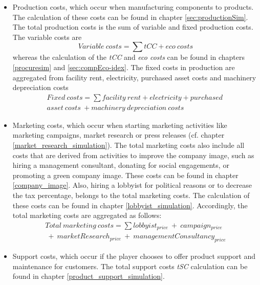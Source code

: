 \begin{itemize}
    \item Production costs, which occur when manufacturing components to products. The calculation of these costs can be found in chapter \ref{sec:productionSim}. The total production costs is the sum of variable and fixed production costs. The variable costs are 
    \begin{equation}
        Variable \ costs = \sum tCC + eco \ costs
    \end{equation}
    whereas the calculation of the \textit{tCC} and \textit{eco costs} can be found in chapters \ref{procuresim} and \ref{sec:compEco-idex}. The fixed costs in production are aggregated from facility rent, electricity, purchased asset costs and machinery depreciation costs
    \begin{equation}
    \begin{split}
        Fixed \ costs = \sum facility \ rent + electricity + purchased \ \\ asset \ costs \ + machinery \ depreciation \ costs
    \end{split}
    \end{equation}
    \item Marketing costs, which occur when starting marketing activities like marketing campaigns, market research or press releases (cf. chapter \ref{market_research_simulation}). The total marketing costs also include all costs that are derived from activities to improve the company image, such as hiring a management consultant, donating for social engagements, or promoting a green company image. These costs can be found in chapter \ref{company_image}. Also, hiring a lobbyist for political reasons or to decrease the tax percentage, belongs to the total marketing costs. The calculation of these costs can be found in chapter \ref{lobbyist_simulation}. Accordingly, the total marketing costs are aggregated as follows:
    \begin{equation}
    \begin{split}
        Total \ marketing \ costs = \sum lobbyist_{price} \ + \ campaign_{price} \\\ + \ marketResearch_{price} \ + \  managementConsultancy_{price}
    \end{split}
    \end{equation}
    \item Support costs, which occur if the player chooses to offer product support and maintenance for customers. The total support costs \textit{tSC} calculation can be found in chapter \ref{product_support_simulation}.
\end{itemize}

